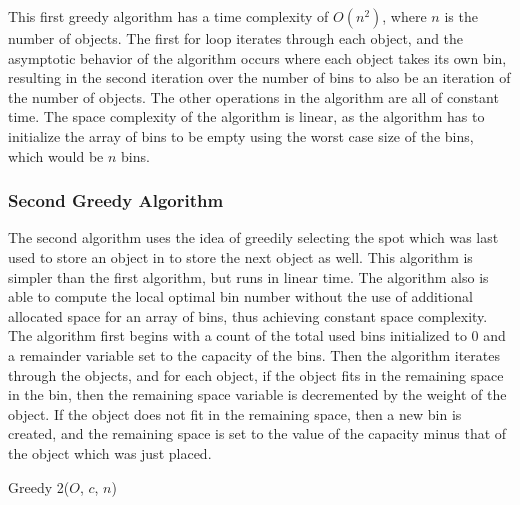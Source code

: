 \documentclass[11pt]{article}
\begin{document}
This first greedy algorithm has a time complexity of ${O(n^2)}$, where ${n}$ is the number of
objects. The first for loop iterates through each object, and the asymptotic behavior of the
algorithm occurs where each object takes its own bin, resulting in the second iteration over the
number of bins to also be an iteration of the number of objects. The other operations in the
algorithm are all of constant time. The space complexity of the algorithm is linear, as the
algorithm has to initialize the array of bins to be empty using the worst case size of the bins,
which would be ${n}$ bins.


\subsubsection{Second Greedy Algorithm}
The second algorithm uses the idea of greedily selecting the spot which was last used to store an
object in to store the next object as well. This algorithm is simpler than the first algorithm, but
runs in linear time. The algorithm also is able to compute the local optimal bin number without the
use of additional allocated space for an array of bins, thus achieving constant space complexity.
The algorithm first begins with a count of the total used bins initialized to 0 and a remainder
variable set to the capacity of the bins. Then the algorithm iterates through the objects, and for
each object, if the object fits in the remaining space in the bin, then the remaining space variable
is decremented by the weight of the object. If the object does not fit in the remaining space, then
a new bin is created, and the remaining space is set to the value of the capacity minus that of the
object which was just placed.

\begin{algorithm}[H]
	\SetAlgoLined
	\SetStartEndCondition{ }{}{}%
	\AlgoDontDisplayBlockMarkers\SetAlgoNoEnd\SetAlgoNoLine%
	\caption{Greedy 2(${O}$, ${c}$, ${n}$)\label{greedy2}}
\end{algorithm}
\end{document}
